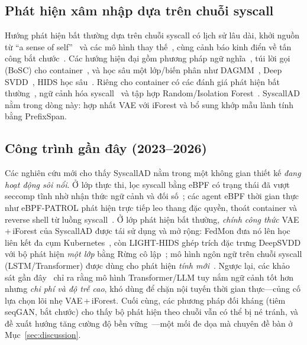 \subsection{Phát hiện xâm nhập dựa trên chuỗi syscall}
Hướng phát hiện bất thường dựa trên chuỗi syscall có lịch sử lâu dài, khởi nguồn từ
``a sense of self''~\cite{forrest1996sense,hofmeyr1998ids} và các mô hình thay
thế~\cite{warrender1999detecting}, cùng cảnh báo kinh điển về tấn công bắt
chước~\cite{wagner2002mimicry}. Các hướng hiện đại gồm phương pháp ngữ
nghĩa~\cite{creech2014semantic}, túi lời gọi (BoSC) cho
container~\cite{abed2015bag}, và học sâu một lớp/biến phân như
DAGMM~\cite{zong2018dagmm}, Deep SVDD~\cite{ruff2018deepsvdd}, HIDS học
sâu~\cite{haider2021deep}. Riêng cho container có các đánh giá phát hiện bất
thường~\cite{castanhel2021peek}, ngữ cảnh hóa syscall~\cite{elkhairi2022chids} và
tập hợp Random/Isolation Forest~\cite{bsoul2022ensemble}. SyscallAD nằm trong dòng
này: hợp nhất VAE với iForest và bổ sung khớp mẫu lành tính bằng PrefixSpan.

\subsection{Công trình gần đây (2023--2026)}
Các nghiên cứu mới cho thấy SyscallAD nằm trong một không gian thiết kế \emph{đang
hoạt động sôi nổi}. Ở lớp thực thi, lọc syscall bằng eBPF có trạng thái đã vượt
seccomp tĩnh nhờ nhận thức ngữ cảnh và đối số~\cite{progsyscall2023}; các agent eBPF
thời gian thực như \mbox{eBPF-PATROL} phát hiện trực tiếp leo thang đặc quyền, thoát
container và reverse shell từ luồng syscall~\cite{ebpfpatrol2025}. Ở lớp phát hiện
bất thường, \emph{chính công thức} VAE\,+\,iForest của SyscallAD được tái sử dụng và
mở rộng: FedMon đưa nó lên học liên kết đa cụm Kubernetes~\cite{fedmon2025}, còn
LIGHT-HIDS ghép trích đặc trưng DeepSVDD với bộ phát hiện \emph{một lớp} bằng Rừng cô
lập~\cite{lighthids2025}; mô hình ngôn ngữ trên chuỗi syscall (LSTM/Transformer)
được dùng cho phát hiện \emph{tính mới}~\cite{lmnovelty2023}. Ngược lại, các khảo sát
gần đây~\cite{dlidssurvey2025,translmidssurvey2024} chỉ ra rằng mô hình
Transformer/LLM tuy nắm ngữ cảnh tốt hơn nhưng \emph{chi phí và độ trễ cao}, khó dùng
để chặn nội tuyến thời gian thực---củng cố lựa chọn lõi nhẹ VAE\,+\,iForest. Cuối
cùng, các phương pháp đối kháng (tiêm seqGAN, bắt chước) cho thấy bộ phát hiện theo
chuỗi vẫn có thể bị né tránh, và đề xuất hướng tăng cường độ bền
vững~\cite{advrobustseq2025}---một mối đe dọa mà chuyên đề bàn ở Mục~\ref{sec:discussion}.

